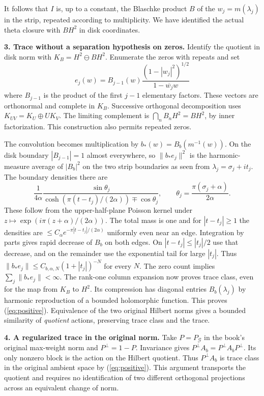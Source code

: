\documentclass[11pt,letterpaper]{article}
\newcommand{\Gg}{\mathcal G}
\newcommand{\head}[1]{\par\smallskip\textbf{#1}\enspace}
\begin{document}
It follows that $I$ is, up to a constant, the Blaschke product $B$ of the $w_j=m(\lambda_j)$ in the strip, repeated according to multiplicity. We have identified the actual theta closure with $B H^2$ in disk coordinates.

\head{3. Trace without a separation hypothesis on zeros.}
Identify the quotient in disk norm with $K_B=H^2\ominus BH^2$. Enumerate the zeros with repeats and set
\[
 e_j(w)=B_{j-1}(w)\frac{(1-|w_j|^2)^{1/2}}{1-\overline{w_j}w}
\]
where $B_{j-1}$ is the product of the first $j-1$ elementary factors. These vectors are orthonormal and complete in $K_B$. Successive orthogonal decomposition uses $K_{UV}=K_U\oplus U K_V$. The limiting complement is $\bigcap_nB_nH^2=BH^2$, by inner factorization. This construction also permits repeated zeros.

The convolution becomes multiplication by $b_*(w)=B_b(m^{-1}(w))$. On the disk boundary $|B_{j-1}|=1$ almost everywhere, so $\|b_*e_j\|^2$ is the harmonic-measure average of $|B_b|^2$ on the two strip boundaries as seen from $\lambda_j=\sigma_j+it_j$. The boundary densities there are
\[
 \frac{1}{4\alpha}
 \frac{\sin\theta_j}{\cosh(\pi(t-t_j)/(2\alpha))\mathbin{\mp}\cos\theta_j},
 \qquad \theta_j=\frac{\pi(\sigma_j+\alpha)}{2\alpha}.
\]
These follow from the upper-half-plane Poisson kernel under $z\mapsto \exp(i\pi(z+\alpha)/(2\alpha))$. The total mass is one and for $|t-t_j|\ge1$ the densities are $\le C_\alpha e^{-\pi|t-t_j|/(2\alpha)}$ uniformly even near an edge. Integration by parts gives rapid decrease of $B_b$ on both edges. On $|t-t_j|\le |t_j|/2$ use that decrease, and on the remainder use the exponential tail for large $|t_j|$. Thus $\|b_*e_j\|\le C_{b,\alpha,N}(1+|t_j|)^{-N}$ for every $N$. The zero count implies $\sum_j\|b_*e_j\|<\infty$. The rank-one column expansion now proves trace class, even for the map from $K_B$ to $H^2$. Its compression has diagonal entries $B_b(\lambda_j)$ by harmonic reproduction of a bounded holomorphic function. This proves (\ref{eq:positive}). Equivalence of the two original Hilbert norms gives a bounded similarity of \emph{quotient} actions, preserving trace class and the trace.

\head{4. A regularized trace in the original norm.}
Take $P=P_{\Gg}$ in the book's original max-weight norm and $P^\perp=1-P$. Invariance gives $P^\perp A_b=P^\perp A_bP^\perp$. Its only nonzero block is the action on the Hilbert quotient. Thus $P^\perp A_b$ is trace class in the original ambient space by (\ref{eq:positive}). This argument transports the quotient and requires no identification of two different orthogonal projections across an equivalent change of norm.
\end{document}
